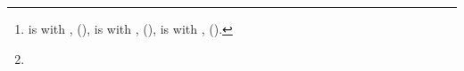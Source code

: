 \documentclass[letterpaper, 10pt, conference]{ieeeconf}
\begin{document}
\title{}

\author{
    \authorblockN{}
    \and
    \authorblockN{}
    \and
    \authorblockN{}
    \thanks{
        \protect is with
        \protect,
        \protect
        (\protect),
        \protect is with 
        \protect,
        \protect 
        (\protect),
        \protect is with 
        \protect,
        \protect 
        (\protect).
    }
    \thanks{
        \protect
    }
}
\maketitle


\end{document}
